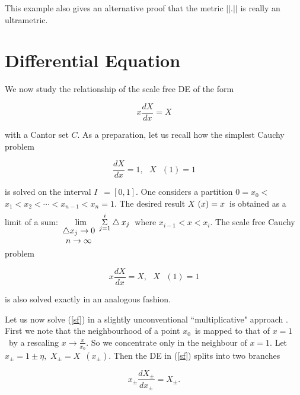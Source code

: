 \documentclass[12pt]{article}
\begin{document}
\vspace{.25cm}

This example also gives an alternative proof that the metric $||.||$ is really an ultrametric.

\section{Differential Equation}

We now study the relationship of the scale free DE of the
form

\begin{equation}\label{eq15}
x\frac{dX}{dx}=X
\end{equation}

\noindent with a Cantor set $C$. As a preparation, let us recall how the simplest
Cauchy problem

\begin{equation}\label{eq16}
\frac{dX}{dx}=1,\text{ }X\text{ }(1)=1
\end{equation}

\noindent is solved on the interval $I$\ $=[0,1]$. One considers a partition $0=x_{0}<$
$x_{1}<x_{2}<\cdots <x_{n-1}<x_{n}=1.$ The desired result $X$ $(x)=x\underset{%
}{}$\ is obtained as a limit of a sum:$\underset{%
\begin{array}{c}
\bigtriangleup x_{j}\rightarrow 0 \\ 
n\rightarrow \infty%
\end{array}%
}{\text{ }\lim }\underset{j=1}{\overset{i}{\Sigma }}\bigtriangleup x_{j}$\
where $x_{i-1}<x<x_{i}.$ The scale free Cauchy problem 

\begin{equation}\label{sf}
x\frac{dX}{dx}=X,\text{ }X\text{ }(1)=1
\end{equation}

\noindent is also solved exactly in an analogous fashion.

\vspace{.25cm}

Let us now solve (\ref{sf}) in a slightly unconventional ``multiplicative"
approach \cite{dp2, dp3}. First we note that the neighbourhood of a point $x_{0}$\ is mapped
to that of $x=1$\ by a rescaling $x\rightarrow \frac{x}{x_{0}}.$ So we
concentrate only in the neighbour of $x=1.$ Let $x_{\pm }=1\pm \eta ,$ $%
X_{\pm }=X$\ $(x_{\pm }).$ Then the DE  in (\ref{sf}) splits into two
branches

\begin{equation}\label{eq18}
x_{\pm }\frac{dX_{\pm }}{dx_{\pm }}=X_{\pm }.
\end{equation}
\end{document}
